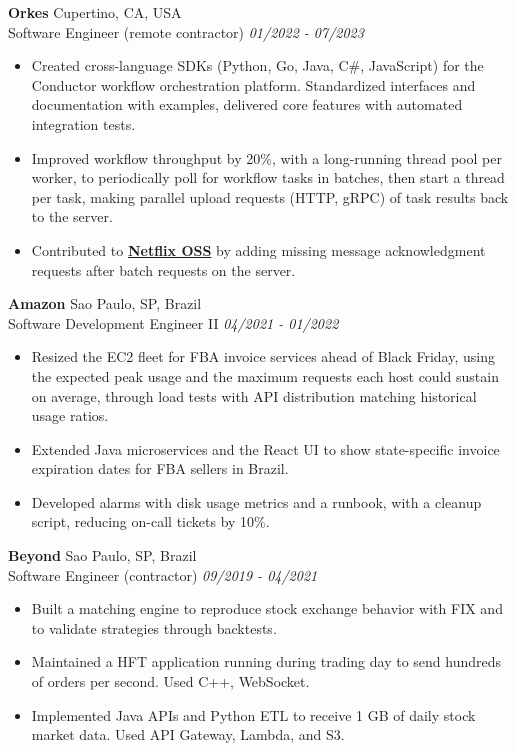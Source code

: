 \documentclass[a4paper,10pt]{article}
\begin{document}
\textbf{Orkes}
    \hfill Cupertino, CA, USA
    \\ Software Engineer (remote contractor)
    \hfill \textit{01/2022 - 07/2023}
\begin{itemize}
    \item Created cross-language SDKs (Python, Go, Java, C\#, JavaScript) for the Conductor workflow orchestration platform. Standardized interfaces and documentation with examples, delivered core features with automated integration tests.
    \item Improved workflow throughput by 20\%, with a long-running thread pool per worker, to periodically poll for workflow tasks in batches, then start a thread per task, making parallel upload requests (HTTP, gRPC) of task results back to the server.
    \item Contributed to \textbf{\href{https://github.com/Netflix/conductor/commit/a13706fc78a3dc040593fd06ae6d9bfc8a7768cf}{Netflix OSS}} by adding missing message acknowledgment requests after batch requests on the server.
\end{itemize}

\textbf{Amazon}
    \hfill Sao Paulo, SP, Brazil 
    \\ Software Development Engineer II
    \hfill \textit{04/2021 - 01/2022}
\begin{itemize}
    \item Resized the EC2 fleet for FBA invoice services ahead of Black Friday, using the expected peak usage and the maximum requests each host could sustain on average, through load tests with API distribution matching historical usage ratios.
    \item Extended Java microservices and the React UI to show state-specific invoice expiration dates for FBA sellers in Brazil.
    \item Developed alarms with disk usage metrics and a runbook, with a cleanup script, reducing on-call tickets by 10\%.
\end{itemize}

\textbf{Beyond}
    \hfill Sao Paulo, SP, Brazil 
    \\ Software Engineer (contractor)
    \hfill \textit{09/2019 - 04/2021}
\begin{itemize}
    \item Built a matching engine to reproduce stock exchange behavior with FIX and to validate strategies through backtests.
    \item Maintained a HFT application running during trading day to send hundreds of orders per second. Used C++, WebSocket.
    \item Implemented Java APIs and Python ETL to receive 1 GB of daily stock market data. Used API Gateway, Lambda, and S3.
\end{itemize}
\end{document}
